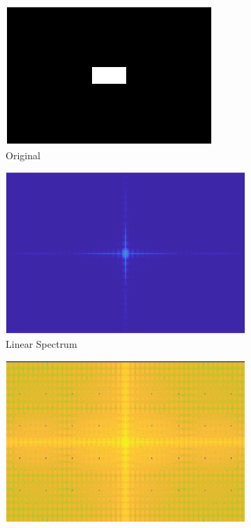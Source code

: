 \begin{figure}[!ht]
    \centering
    \begin{subfigure}{0.32\textwidth}
        \centering
        \includegraphics[width=\textwidth]{Doc/Graphics/Part1/Q3_rect.png}
        \caption{Original}
    \end{subfigure}
    \hfill
    \begin{subfigure}{0.32\textwidth}
        \centering
        \includegraphics[width=\textwidth]{Doc/Graphics/Part1/Q13_Rectangle.png}
        \caption{Linear Spectrum}
    \end{subfigure}
    \hfill
    \begin{subfigure}{0.32\textwidth}
        \centering
        \includegraphics[width=\textwidth]{Doc/Graphics/Part1/Q13_log_Rectangle.png}

\end{subfigure}
\end{figure}
